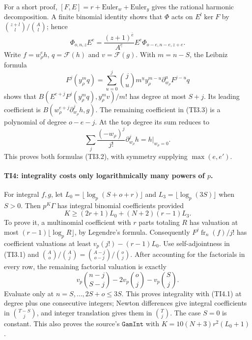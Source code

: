\documentclass[11pt,a4paper]{article}
\numberwithin{equation}{section}
\theoremstyle{remark}\newtheorem{remark}[theorem]{Remark}
\begin{document}
For a short proof, $[F,E]=r+\mathrm{Euler}_w+\mathrm{Euler}_y$ gives
the rational harmonic decomposition.  A finite binomial identity shows
that $\Phi$ acts on $E^l\ker F$ by $\binom{z+l}l/\binom Al$; hence
\[
 \Phi_{o,n,z}E^e=
 \frac{(z+1)^{\overline e}}{A^{\underline e}}
 E^e\Phi_{o-e,n-e,z+e}.
 \tag{TI3.3}
\]
Write $f=w_\rho^eh$, $q=\mathcal F(h)$ and $v=\mathcal F(g)$.
With $m=n-S$, the Leibniz formula
\[
 F^j(y_\rho^mq)=\sum_{u=0}^j\binom ju m^{\underline u}
 y_\rho^{m-u}\partial_{w_\rho}^uF^{j-u}q
\]
shows that $B(E^{e+j}F^j(y_\rho^mq),y_\rho^mv)/m!$ has degree at
most $S+j$.  Its leading coefficient is
$B(w_\rho^{e+j}\partial_{w_\rho}^jh,g)$.
The remaining coefficient in (TI3.3) is a polynomial of degree $o-e-j$.
At the top degree its sum reduces to
\[
 \sum_j\frac{(-w_\rho)^j}{j!}\partial_{w_\rho}^jh
 =h\big|_{w_\rho=0}.
\]
This proves both formulas (TI3.2), with symmetry supplying $\max(e,e')$.

\paragraph{TI4: integrality costs only logarithmically many powers of $p$.}
For integral $f,g$, let $L_0=\lfloor\log_p(S+o+r)\rfloor$ and
$L_3=\lfloor\log_p(3S)\rfloor$ when $S>0$. Then $p^K\Gamma$ has
integral binomial coefficients provided
\[
 K\geq(2r+1)L_0+(N+2)(r-1)L_3.
 \tag{TI4.1}
\]
To prove it, a multinomial coefficient with $r$ parts totaling $R$ has
valuation at most $(r-1)\lfloor\log_pR\rfloor$, by Legendre's formula.
Consequently $F^j\operatorname{fr}_n(f)/j!$ has coefficient valuations
at least $v_p(j!)-(r-1)L_0$.
Use self-adjointness in (TI3.1) and
$\binom Ao/\binom Aj=\binom{A-j}{o-j}/\binom oj$.
After accounting for the factorials in every row, the remaining factorial
valuation is exactly
\[
 v_p\binom{n-j}{S-j}-2v_p\binom oj-v_p\binom Sj.
\]
Evaluate only at $n=S,\ldots,2S+o\leq3S$.
This proves integrality with (TI4.1) at degree plus one consecutive integers;
Newton differences give integral coefficients in $\binom{T-S}j$, and
integer translation gives them in $\binom Tj$.
The case $S=0$ is constant.  This also proves the source's
$\texttt{GamInt}$ with $K=10(N+3)r^2(L_0+1)$.
\end{document}
